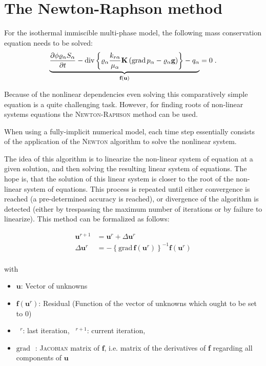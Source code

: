 \chapter{The Newton-Raphson method}

For the isothermal immiscible multi-phase model, the following mass
conservation equation needs to be solved:
\begin{align}
\underbrace{
  \frac{\partial \phi \varrho_\alpha S_\alpha}{\partial t}
 -
 \text{div} \left\{
 \varrho_\alpha \frac{k_{r\alpha}}{\mu_\alpha} \mbox{\bf K} \left(\text{grad}\, p_\alpha - \varrho_{\alpha} \mbox{\bf g} \right)
 \right\} - q_\alpha} _
{\textbf{f}(\textbf{u})}
= 0 \; .
\end{align}

Because of the nonlinear dependencies even solving this comparatively
simple equation is a quite challenging task. However, for
finding roots of non-linear systems equations the
\textsc{Newton}-\textsc{Raphson} method can be used.

When using a fully-implicit numerical model, each time step essentially
consists of the application of the \textsc{Newton} algorithm to solve
the nonlinear system.

The idea of this algorithm is to linearize the non-linear system of
equation at a given solution, and then solving the resulting linear
system of equations. The hope is, that the solution of this linear
system is closer to the root of the non-linear system of
equations. This process is repeated until either convergence is
reached (a pre-determined accuracy is reached), or divergence of the
algorithm is detected (either by trespassing the maximum number of
iterations or by failure to linearize). This method can be formalized
as follows:

\begin{subequations}
\begin{align}
\label{NewtonGen}
\textbf{u}^{r+1} &= \textbf{u}^r + \Delta \textbf{u}^r \\
\Delta \textbf{u}^r & = - \left\{\text{grad}\,\textbf{f} (\textbf{u}^r) \right\}^{-1} \textbf{f}(\textbf{u}^r) \\
\end{align}
\end{subequations}

\noindent with
\begin{itemize}
\item $\textbf{u}$: Vector of unknowns
\item $\textbf{f}(\textbf{u}^r)$: Residual (Function of the vector of unknowns which ought to be set to $0$)
\item $\phantom{a}^r$: last iteration, $\phantom{a}^{r+1}$: current iteration,
\item $\text{grad}\,\phantom{a}$: \textsc{Jacobian} matrix of
  $\textbf{f}$, i.e. matrix of the derivatives of \textbf{f} regarding
  all components of $\textbf{u}$
\end{itemize}

